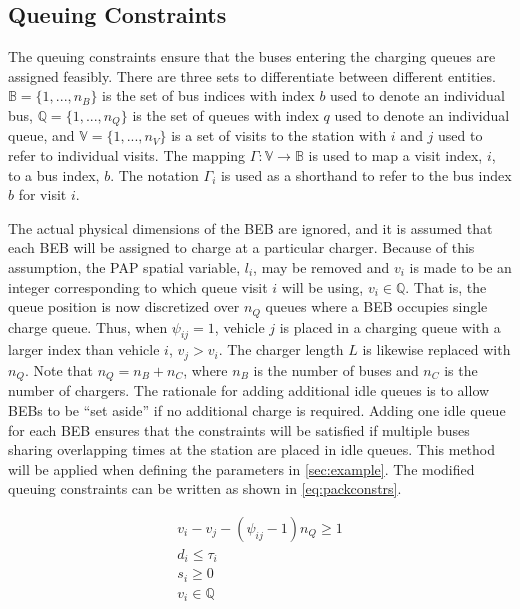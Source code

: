 \documentclass[ee,thesis]{usuthesis}
\begin{document}
\subsection{Queuing Constraints}
\label{sec:queuing}
\noindent The queuing constraints ensure that the buses entering the charging queues are assigned
feasibly. There are three sets to differentiate between different entities. \(\mathbb{B} = \{1, ..., n_B\}\) is the set of
bus indices with index \(b\) used to denote an individual bus, \(\mathbb{Q} = \{1, ..., n_Q\}\) is the set of queues with index \(q\)
used to denote an individual queue, and \(\mathbb{V} = \{1, ..., n_V\}\) is a set of visits to the station with \(i\) and
\(j\) used to refer to individual visits. The mapping \(\Gamma: \mathbb{V} \rightarrow \mathbb{B}\) is used to map a visit
index, \(i\), to a bus index, \(b\). The notation \(\Gamma_i\) is used as a shorthand to refer to the bus index \(b\) for visit
\(i\).

The actual physical dimensions of the BEB are ignored, and it is assumed that each BEB will be assigned to charge at a
particular charger. Because of this assumption, the PAP spatial variable, \(l_i\), may be removed and \(v_i\) is made to be
an integer corresponding to which queue visit \(i\) will be using, \(v_i \in \mathbb{Q}\). That is, the queue position is now
discretized over \(n_Q\) queues where a BEB occupies single charge queue. Thus, when \(\psi_{ij} = 1\), vehicle \(j\) is placed
in a charging queue with a larger index than vehicle \(i\), \(v_j > v_i\). The charger length \(L\) is likewise replaced with
\(n_Q\). Note that \(n_Q = n_B + n_C\), where \(n_B\) is the number of buses and \(n_C\) is the number of chargers. The
rationale for adding additional idle queues is to allow BEBs to be ``set aside'' if no additional charge is required.
Adding one idle queue for each BEB ensures that the constraints will be satisfied if multiple buses sharing overlapping
times at the station are placed in idle queues. This method will be applied when defining the parameters in
\autoref{sec:example}. The modified queuing constraints can be written as shown in \autoref{eq:packconstrs}.

\begin{subequations}
\label{eq:packconstrs}
\begin{align}
    v_i - v_j - (\psi_{ij} - 1)n_Q \geq 1 \label{subeq:space} \\ d_i \leq \tau_i \label{subeq:valid_depart} \\ s_i \geq
    0 \label{subeq:pos_charge} \\ v_i \in \mathbb{Q} \label{subeq:vspace}
\end{align}
\end{subequations}
\end{document}
